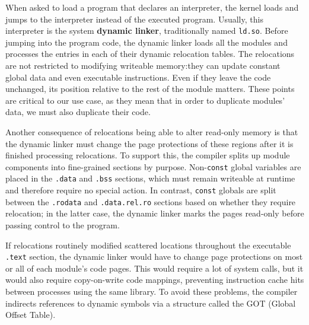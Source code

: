 When asked to load a program that declares an interpreter, the kernel loads and jumps
to the interpreter instead of the executed program.  Usually, this interpreter is the
system \textbf{dynamic linker}, traditionally named \texttt{ld.so}.  Before jumping
into the program code, the dynamic linker loads all the modules and processes the
entries in each of their dynamic relocation tables.  The relocations are not
restricted to modifying writeable memory:\@ they can update constant global data and
even executable instructions.  Even if they leave the code unchanged, its position
relative to the rest of the module matters.  These points are critical to our use
case, as they mean that in order to duplicate modules' data, we must also duplicate
their code.

Another consequence of relocations being able to alter read-only memory is that the
dynamic linker must change the page protections of these regions after it is finished
processing relocations.  To support this, the compiler splits up module components
into fine-grained sections by purpose.  Non-\texttt{const} global variables are
placed in the \texttt{.data} and \texttt{.bss} sections, which must remain writeable
at runtime and therefore require no special action.  In contrast, \texttt{const}
globals are split between the \texttt{.rodata} and \texttt{.data.rel.ro} sections
based on whether they require relocation; in the latter case, the dynamic linker
marks the pages read-only before passing control to the program.

If relocations routinely modified scattered locations throughout the executable
\texttt{.text} section, the dynamic linker would have to change page protections on
most or all of each module's code pages.  This would require a lot of system calls,
but it would also require copy-on-write code mappings, preventing instruction cache
hits between processes using the same library.  To avoid these problems, the compiler
indirects references to dynamic symbols via a structure called the GOT (Global Offset
Table).

